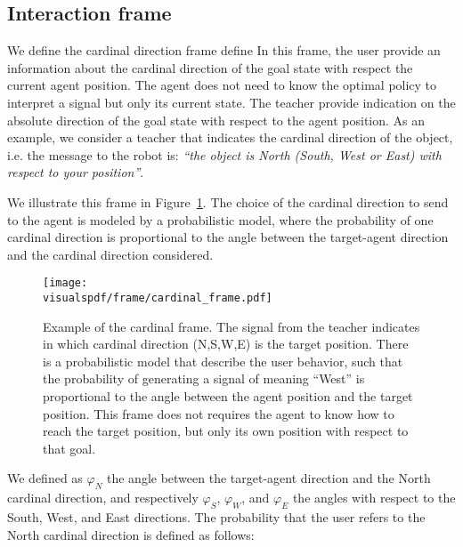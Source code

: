 \subsection{Interaction frame}

We define the cardinal direction frame define 
In this frame, the user provide an information about the cardinal direction of the goal state with respect the current agent position. The agent does not need to know the optimal policy to interpret a signal but only its current state. The teacher provide indication on the absolute direction of the goal state with respect to the agent position. As an example, we consider a teacher that indicates the cardinal direction of the object, i.e. the message to the robot is: \emph{``the object is North (South, West or East) with respect to your position''}.

We illustrate this frame in Figure~\ref{fig:cardinalframe}. The choice of the cardinal direction to send to the agent is modeled by a probabilistic model, where the probability of one cardinal direction is proportional to the angle between the target-agent direction and the cardinal direction considered.

\begin{figure}[!htbp]
    \centering
    \texttt{[image: \\visualspdf/frame/cardinal\_frame.pdf]}
    \caption{Example of the cardinal frame. The signal from the teacher indicates in which cardinal direction (N,S,W,E) is the target position. There is a probabilistic model that describe the user behavior, such that the probability of generating a signal of meaning ``West'' is proportional to the angle between the agent position and the target position. This frame does not requires the agent to know how to reach the target position, but only its own position with respect to that goal.}
    \label{fig:cardinalframe}
\end{figure}

We defined as $\varphi_N$ the angle between the target-agent direction and the North cardinal direction, and respectively $\varphi_S$, $\varphi_W$, and $\varphi_E$ the angles with respect to the South, West, and East directions. The probability that the user refers to the North cardinal direction is defined as follows:

